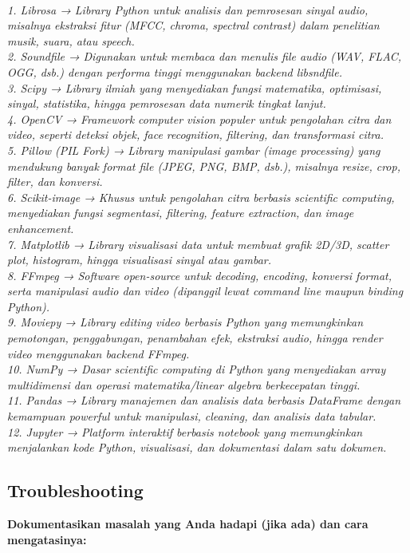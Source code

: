 \documentclass[11pt,a4paper]{article}
\begin{document}
\begin{enumerate}
    \textit{
        \\1. Librosa → Library Python untuk analisis dan pemrosesan sinyal audio, misalnya ekstraksi fitur (MFCC, chroma, spectral contrast) dalam penelitian musik, suara, atau speech. \\
        2. Soundfile → Digunakan untuk membaca dan menulis file audio (WAV, FLAC, OGG, dsb.) dengan performa tinggi menggunakan backend libsndfile. \\
        3. Scipy → Library ilmiah yang menyediakan fungsi matematika, optimisasi, sinyal, statistika, hingga pemrosesan data numerik tingkat lanjut. \\
        4. OpenCV → Framework computer vision populer untuk pengolahan citra dan video, seperti deteksi objek, face recognition, filtering, dan transformasi citra. \\
        5. Pillow (PIL Fork) → Library manipulasi gambar (image processing) yang mendukung banyak format file (JPEG, PNG, BMP, dsb.), misalnya resize, crop, filter, dan konversi. \\
        6. Scikit-image → Khusus untuk pengolahan citra berbasis scientific computing, menyediakan fungsi segmentasi, filtering, feature extraction, dan image enhancement. \\
        7. Matplotlib → Library visualisasi data untuk membuat grafik 2D/3D, scatter plot, histogram, hingga visualisasi sinyal atau gambar. \\
        8. FFmpeg → Software open-source untuk decoding, encoding, konversi format, serta manipulasi audio dan video (dipanggil lewat command line maupun binding Python). \\
        9. Moviepy → Library editing video berbasis Python yang memungkinkan pemotongan, penggabungan, penambahan efek, ekstraksi audio, hingga render video menggunakan backend FFmpeg. \\
        10. NumPy → Dasar scientific computing di Python yang menyediakan array multidimensi dan operasi matematika/linear algebra berkecepatan tinggi. \\
        11. Pandas → Library manajemen dan analisis data berbasis DataFrame dengan kemampuan powerful untuk manipulasi, cleaning, dan analisis data tabular. \\
        12. Jupyter → Platform interaktif berbasis notebook yang memungkinkan menjalankan kode Python, visualisasi, dan dokumentasi dalam satu dokumen.
    }
\end{enumerate}

\subsection{Troubleshooting}
\textbf{Dokumentasikan masalah yang Anda hadapi (jika ada) dan cara mengatasinya:}
\end{document}
